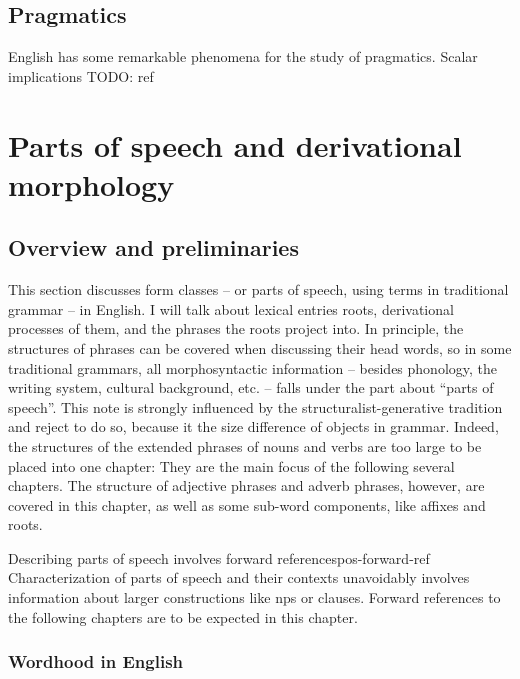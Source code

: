 \documentclass[UTF8, a4paper, oneside, scheme=plain]{ctexrep}
\begin{document}
\section{Pragmatics}

English has some remarkable phenomena for the study of pragmatics.
Scalar implications TODO: ref

\chapter{Parts of speech and derivational morphology}\label{chap:pos}

\section{Overview and preliminaries}\label{sec:nouns.overview}

This section discusses form classes -- or parts of speech, using terms in traditional grammar -- in English.
I will talk about lexical entries roots, derivational processes of them,  
and the phrases the roots project into.
In principle, the structures of phrases can be covered when discussing their head words,
so in some traditional grammars,
all morphosyntactic information -- besides phonology, the writing system, cultural background, etc. -- 
falls under the part about ``parts of speech''.
This note is strongly influenced by the structuralist-generative tradition
and reject to do so, 
because it the size difference of objects in grammar.
Indeed, the structures of the extended phrases of nouns and verbs are too large 
to be placed into one chapter:
They are the main focus of the following several chapters.
The structure of adjective phrases and adverb phrases, however, are covered in this chapter,
as well as some sub-word components, like affixes and roots.

\begin{learnbox}{Describing parts of speech involves forward references}{pos-forward-ref}
    Characterization of parts of speech and their contexts unavoidably involves 
    information about larger constructions like \acs{np}s or clauses.
    Forward references to the following chapters are to be expected in this chapter.
\end{learnbox}

\subsection{Wordhood in English}
\end{document}
